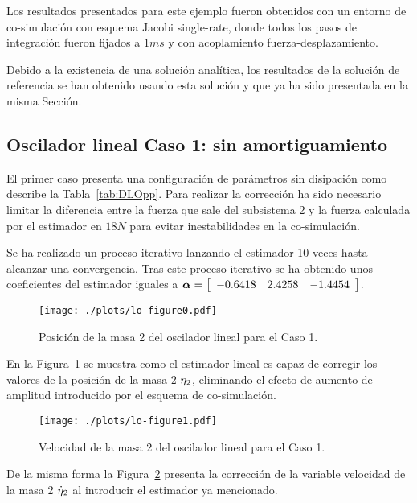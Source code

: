 Los resultados presentados para este ejemplo fueron obtenidos con un entorno de co-simulación con esquema Jacobi single-rate, donde todos los pasos de integración fueron fijados a $1\unit{ms}$ y con acoplamiento fuerza-desplazamiento. 

Debido a la existencia de una solución analítica, los resultados de la solución de referencia se han obtenido usando esta solución y que ya ha sido presentada en la misma Sección.

\subsection{Oscilador lineal Caso 1: sin amortiguamiento}
\label{subsec:res_oscilador1}

El primer caso presenta una configuración  de parámetros sin disipación como describe la Tabla~\ref{tab:DLOpp}.
Para realizar la corrección ha sido necesario limitar la diferencia entre la fuerza que sale del subsistema 2 y la fuerza calculada por el estimador en $18\unit{N}$ para evitar inestabilidades en la co-simulación.

Se ha realizado un proceso iterativo lanzando el estimador 10 veces hasta alcanzar una convergencia.
Tras este proceso iterativo se ha obtenido unos coeficientes del estimador iguales a $\coefficients = \sqbr{\matr{ccc}{-0.6418  & 2.4258 & -1.4454}}$.

\begin{figure}[ht!]\centering
	\texttt{[image: ./plots/lo-figure0.pdf]}
	\caption{Posición de la masa 2 del oscilador lineal para el Caso 1.}
	\label{fig:OsciladorLinealPos1}
\end{figure}

En la Figura~\ref{fig:OsciladorLinealPos1} se muestra como el estimador lineal es capaz de corregir los valores de la posición de la masa 2 $\displacement_2$, eliminando el efecto de aumento de amplitud introducido por el esquema de co-simulación.


\begin{figure}[ht!]\centering
	\texttt{[image: ./plots/lo-figure1.pdf]}
	\caption{Velocidad de la masa 2 del oscilador lineal para el Caso 1.}
	\label{fig:OsciladorLinealVel1}
\end{figure}

De la misma forma la Figura~\ref{fig:OsciladorLinealVel1} presenta la corrección de la variable velocidad de la masa 2 $\velocity_2$ al introducir el estimador ya mencionado.

